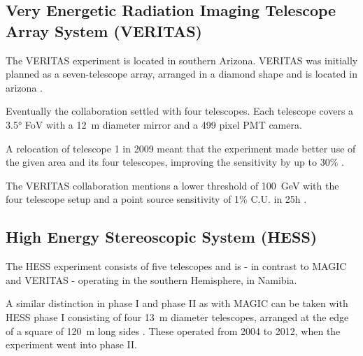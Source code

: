 \subsection{Very Energetic Radiation Imaging Telescope Array System (VERITAS)}
The VERITAS experiment is located in southern Arizona.
VERITAS	was initially planned as a seven-telescope array, arranged in a diamond shape
and is located in arizona \cite{WEEKES2002221}.

Eventually the collaboration settled 
with four telescopes. 
Each telescope covers a 3.5° FoV with a \SI{12}{\meter} diameter mirror and 
a 499 pixel PMT camera.

A relocation of telescope 1 in 2009 meant that the 
experiment made better use of the given area and its four telescopes,
improving the sensitivity by up to 30\% \cite{2009arXiv0912.3841P}.

The VERITAS collaboration mentions a lower threshold of \SI{100}{\giga\electronvolt}
with the four telescope setup and a point source sensitivity of
1\% C.U. in 25h \cite{veritas}.



\subsection{High Energy Stereoscopic System (HESS)}

The HESS experiment consists of five telescopes and 
is - in contrast to MAGIC and VERITAS - operating in the southern 
Hemisphere, in Namibia.

A similar distinction in phase I and phase II as with MAGIC can be taken with 
HESS phase I consisting of four \SI{13}{\meter} diameter telescopes,
arranged at the edge of a square of \SI{120}{\meter} long sides \cite{HINTON2004331}.
These operated from 2004 to 2012, when the experiment went into phase II.

